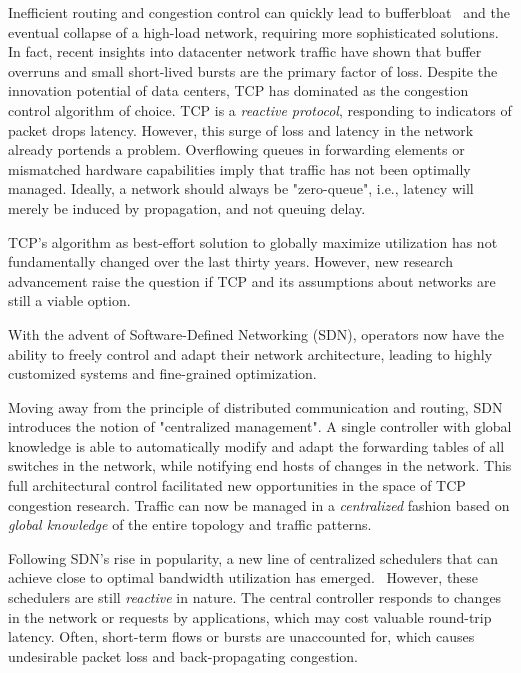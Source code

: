 Inefficient routing and congestion control can quickly lead to 
bufferbloat~\cite{bufferbloat} and the eventual collapse of a high-load 
network, requiring more sophisticated solutions. In fact, recent insights into 
datacenter network traffic have shown that buffer overruns and small 
short-lived bursts are the primary factor of loss.\cite{fb_dc,msr_dc}
Despite the innovation potential of data centers, TCP has dominated as 
the congestion control algorithm of choice.
TCP is a \textit{reactive protocol}, responding to indicators of packet drops
latency. However, this surge of loss and latency in the network already 
portends a problem. Overflowing queues in forwarding elements or mismatched 
hardware capabilities imply that traffic has not been optimally managed.
Ideally, a network should always be "zero-queue", i.e., latency 
will merely be induced by propagation, and not queuing delay.

TCP's algorithm as best-effort solution to globally maximize utilization has 
not fundamentally changed over the last thirty years. However, new research 
advancement raise the question if TCP and its assumptions about networks are 
still a viable option.~\cite{pcc,bbr,perc}

With the advent of Software-Defined Networking (SDN), operators now have the 
ability to freely control and adapt their network architecture, leading to 
highly customized systems and fine-grained optimization.~\cite{sdn_road}

Moving away from the principle of distributed communication and routing, SDN 
introduces the notion of "centralized management". A single controller with 
global knowledge is able to automatically modify and adapt the forwarding 
tables of all switches in the network, while notifying end hosts of changes in 
the network.
This full architectural control facilitated new opportunities in the space of 
TCP congestion research. Traffic can now be managed in a  \textit{centralized} 
fashion based on \textit{global knowledge} of the entire topology and traffic 
patterns.

Following SDN's rise in popularity, a new line of centralized schedulers that 
can achieve close to optimal bandwidth utilization has emerged.~\cite{hedera, 
fastpass, microte, b4, dionysus}
However, these schedulers are still \textit{reactive} in nature. The central 
controller responds to changes in the network or requests by applications, 
which may cost valuable round-trip latency. Often, short-term flows or bursts 
are unaccounted for, which causes undesirable packet loss and back-propagating 
congestion.~\cite{perc}

